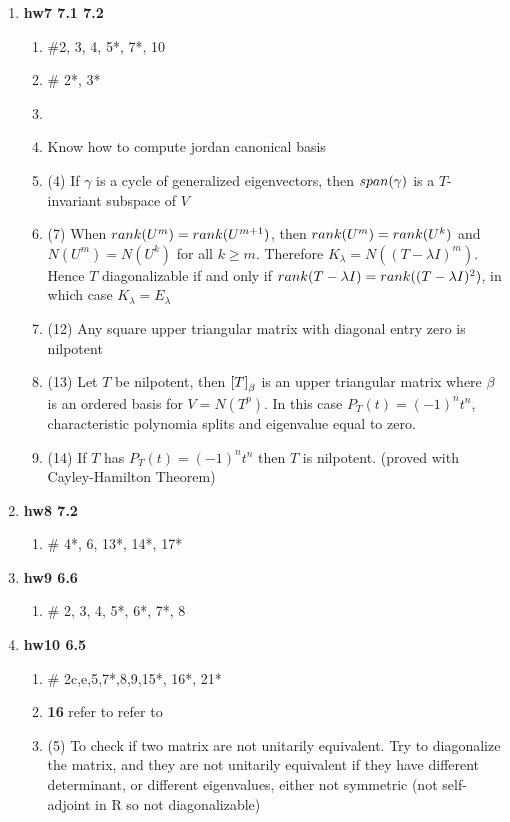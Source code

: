\documentclass[11pt]{article}
\begin{document}
\begin{enumerate}
\begin{enumerate}
    \end{enumerate}
    \item \textbf{hw7 7.1 7.2} 
    \begin{enumerate}
        \item {} \#2, 3, 4, 5*, 7*, 10
        \item {} \# 2*, 3*
        \item {}
        \item Know how to compute jordan canonical basis 
        \item (4) If $\gamma$ is a cycle of generalized eigenvectors, then $span(\gamma)$ is a $T$-invariant subspace of $V$ 
        \item (7) When $rank(U^m) = rank(U^{m+1})$, then $rank(U^m) = rank(U^k)$ and $N(U^m) = N(U^k)$ for all $k\geq m$. Therefore $K_{\lambda} = N((T-\lambda I)^m)$. Hence $T$ diagonalizable if and only if $rank(T-\lambda I) = rank((T-\lambda I)^2)$, in which case $K_{\lambda} = E_{\lambda}$
        \item (12) Any square upper triangular matrix with diagonal entry zero is nilpotent 
        \item (13) Let $T$ be nilpotent, then $\left[ T \right]_{\beta}$ is an upper triangular matrix where $\beta$ is an ordered basis for $V = N(T^p)$. In this case $P_T(t) = (-1)^n t^n$, characteristic polynomia splits and eigenvalue equal to zero.
        \item (14) If $T$ has $P_T(t) = (-1)^n t^n$ then $T$ is nilpotent. (proved with Cayley-Hamilton Theorem)
    \end{enumerate}
    \item \textbf{hw8 7.2} 
    \begin{enumerate}
        \item {} \# 4*, 6, 13*, 14*, 17*
    \end{enumerate}
    \item \textbf{hw9 6.6} 
    \begin{enumerate}
        \item {} \# 2, 3, 4, 5*, 6*, 7*, 8
    \end{enumerate}
    \item \textbf{hw10 6.5} 
    \begin{enumerate}
        \item {}  \# 2c,e,5,7*,8,9,15*, 16*, 21*
        \item \textbf{16} refer to  refer to 
        \item (5) To check if two matrix are not unitarily equivalent. Try to diagonalize the matrix, and they are not unitarily equivalent if they have different determinant, or different eigenvalues, either not symmetric (not self-adjoint in R so not diagonalizable)
    \end{enumerate}
\end{enumerate}
\end{document}
